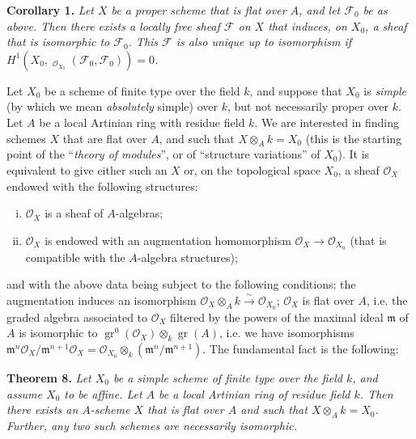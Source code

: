 \documentclass{article}
\newenvironment{itenv}[1]
  {\phantomsection\par\medskip\noindent\textbf{#1.}\itshape}
  {\medskip}
\newcommand{\scr}[1]{{\mathscr{#1}}}
\newcommand{\fk}{\mathfrak}
\DeclareMathOperator{\Hom}{Hom}
\DeclareMathOperator{\shHom}{\underline{\Hom}}
\DeclareMathOperator{\gr}{gr}
\newcommand{\oldpage}[1]{\marginpar{\footnotesize$\Big\vert$ \textit{p.~#1}}}
\begin{document}
\begin{itenv}{Corollary 1}
\label{proposition3corollary1}
  Let $X$ be a proper scheme that is flat over $A$, and let $\scr{F}_0$ be as above.
  Then there exists a locally free sheaf $\scr{F}$ on $X$ that induces, on $X_0$, a sheaf that is isomorphic to $\scr{F}_0$.
  This $\scr{F}$ is also unique up to isomorphism if $H^1(X_0,\shHom_{\scr{O}_{X_0}}(\scr{F}_0,\scr{F}_0))=0$.
\end{itenv}

Let $X_0$ be a scheme of finite type over the field $k$, and suppose that $X_0$ is \emph{simple} (by which we mean \emph{absolutely} simple) over $k$, but not necessarily proper over $k$.
Let $A$ be a local Artinian ring with residue field $k$.
We are interested in finding schemes $X$ that are flat over $A$, and such that $X\otimes_A k=X_0$ (this is the starting point of the ``\emph{theory of modules}'', or of ``structure variations''
\oldpage{182-12}
of $X_0$).
It is equivalent to give either such an $X$ or, on the topological space $X_0$, a sheaf $\scr{O}_X$ endowed with the following structures:
\begin{enumerate}[i.]
  \item $\scr{O}_X$ is a sheaf of $A$-algebras;
  \item $\scr{O}_X$ is endowed with an augmentation homomorphism $\scr{O}_X\to\scr{O}_{X_0}$ (that is compatible with the $A$-algebra structures);
\end{enumerate}
and with the above data being subject to the following conditions: the augmentation induces an isomorphism $\scr{O}_X\otimes_A k\xrightarrow{\sim}\scr{O}_{X_0}$;
$\scr{O}_X$ is flat over $A$, i.e. the graded algebra associated to $\scr{O}_X$ filtered by the powers of the maximal ideal $\fk{m}$ of $A$ is isomorphic to $\gr^0(\scr{O}_X)\otimes_k\gr(A)$, i.e. we have isomorphisms $\fk{m}^n\scr{O}_X/\fk{m}^{n+1}\scr{O}_X = \scr{O}_{X_0}\otimes_k(\fk{m}^n/\fk{m}^{n+1})$.
The fundamental fact is the following:

\begin{itenv}{Theorem 8}
\label{theorem8}
  Let $X_0$ be a simple scheme of finite type over the field $k$, and assume $X_0$ to be affine.
  Let $A$ be a local Artinian ring of residue field $k$.
  Then there exists an $A$-scheme $X$ that is flat over $A$ and such that $X\otimes_A k=X_0$.
  Further, any two such schemes are necessarily isomorphic.
\end{itenv}
\end{document}
